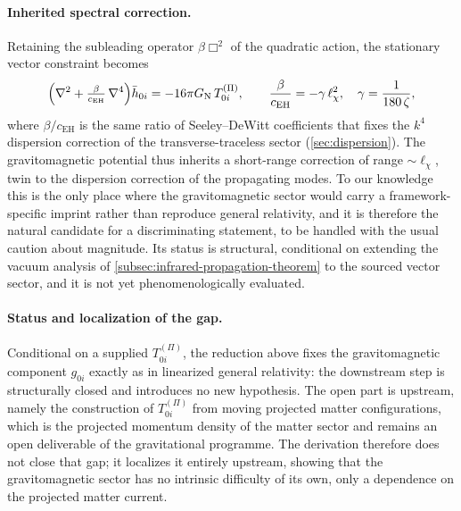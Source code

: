     \paragraph{Inherited spectral correction.}
      Retaining the subleading operator $\beta\Box^2$ of the quadratic action, the stationary vector constraint
      becomes
      \[
        \Bigl(\nabla^2 + \tfrac{\beta}{c_{\mathrm{EH}}}\,\nabla^4\Bigr)\bar h_{0i}
        = -16\pi G_{\mathrm{N}}\, T^{(\Pi)}_{0i},
        \qquad
        \frac{\beta}{c_{\mathrm{EH}}} = -\gamma\,\ell_\chi^2,
        \quad \gamma = \frac{1}{180\,\zeta},
      \]
      where $\beta/c_{\mathrm{EH}}$ is the same ratio of Seeley--DeWitt coefficients that fixes the $k^4$
      dispersion correction of the transverse-traceless sector (\cref{sec:dispersion}).
      The gravitomagnetic potential thus inherits a short-range correction of range $\sim\ell_\chi$, twin to the
      dispersion correction of the propagating modes.
      To our knowledge this is the only place where the gravitomagnetic sector would carry a framework-specific
      imprint rather than reproduce general relativity, and it is therefore the natural candidate for a
      discriminating statement, to be handled with the usual caution about magnitude.
      Its status is structural, conditional on extending the vacuum analysis of
      \cref{subsec:infrared-propagation-theorem} to the sourced vector sector, and it is not yet phenomenologically
      evaluated.

    \paragraph{Status and localization of the gap.}
      Conditional on a supplied $T^{(\Pi)}_{0i}$, the reduction above fixes the gravitomagnetic component $g_{0i}$
      exactly as in linearized general relativity: the downstream step is structurally closed and introduces no new
      hypothesis.
      The open part is upstream, namely the construction of $T^{(\Pi)}_{0i}$ from moving projected matter
      configurations, which is the projected momentum density of the matter sector and remains an open deliverable
      of the gravitational programme.
      The derivation therefore does not close that gap; it localizes it entirely upstream, showing that the
      gravitomagnetic sector has no intrinsic difficulty of its own, only a dependence on the projected matter
      current.
